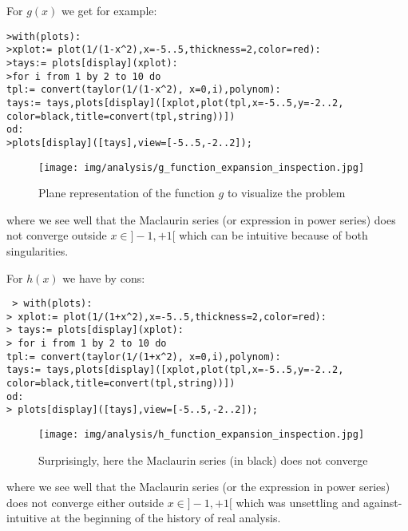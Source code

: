 	For $g(x)$ we get for example:
	
	\texttt{>with(plots):\\
	>xplot:= plot(1/(1-x\string^2),x=-5..5,thickness=2,color=red):\\
	>tays:= plots[display](xplot):\\
	>for i from 1 by 2 to 10 do\\
		tpl:= convert(taylor(1/(1-x\string^2), x=0,i),polynom):\\
		tays:= tays,plots[display]([xplot,plot(tpl,x=-5..5,y=-2..2,\\
		color=black,title=convert(tpl,string))])\\
		od:\\
	>plots[display]([tays],view=[-5..5,-2..2]);}
	
	\begin{figure}[H]
		\begin{center}
			\texttt{[image: img/analysis/g\_function\_expansion\_inspection.jpg]}
		\end{center}	
		\caption[]{Plane representation of the function $g$ to visualize the problem}
	\end{figure}
	where we see well that the Maclaurin series (or expression in power series) does not converge outside $x \in ]-1,+1[$  which can be intuitive because of both singularities.
	
	For $h(x)$ we have by cons:
	
	\texttt{
	> with(plots):\\
	> xplot:= plot(1/(1+x\string^2),x=-5..5,thickness=2,color=red):\\
	> tays:= plots[display](xplot):\\
	> for i from 1 by 2 to 10 do\\
		tpl:= convert(taylor(1/(1+x\string^2), x=0,i),polynom):\\
		tays:= tays,plots[display]([xplot,plot(tpl,x=-5..5,y=-2..2,\\
		color=black,title=convert(tpl,string))])\\
	od:\\
	> plots[display]([tays],view=[-5..5,-2..2]);\\
	}
	
	\begin{figure}[H]
		\begin{center}
			\texttt{[image: img/analysis/h\_function\_expansion\_inspection.jpg]}
		\end{center}	
		\caption[Divergent Maclaurin series]{Surprisingly, here the Maclaurin series (in black) does not converge}
	\end{figure}
	where we see well that the Maclaurin series (or the expression in power series) does not converge either outside $x \in ]-1,+1[$ which was unsettling and against-intuitive at the beginning of the history of real analysis.
	
